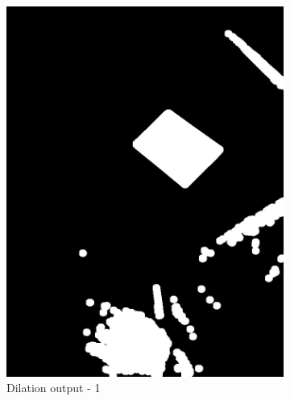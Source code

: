 \documentclass[paper=a4, fontsize=10pt]{scrartcl} %
\numberwithin{equation}{section} %
\numberwithin{figure}{section} %
\begin{document}
\begin{figure}[!ht]
	\centering
	\begin{subfigure}[b]{0.275\textwidth}
		\includegraphics[width=\textwidth]{dilation_01}
		\caption{Dilation output - 1}
		\label{fig:dilation_output_01}
	\end{subfigure}
	~ 
	\begin{subfigure}[b]{0.275\textwidth}

\end{subfigure}
\end{figure}
\end{document}
